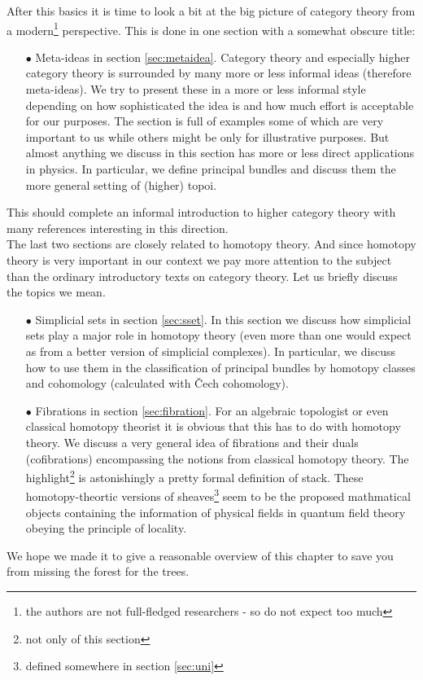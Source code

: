 After this basics it is time to look a bit at the big picture of category theory from a modern\footnote{the authors are not full-fledged researchers - so do not expect too much} perspective. This is done in one section with a somewhat obscure title:
\begin{enumerate}
\item[$\bullet$]
Meta-ideas in section \ref{sec:metaidea}. Category theory and especially higher category theory is surrounded by many more or less informal ideas (therefore meta-ideas). We try to present these in a more or less informal style depending on how sophisticated the idea is and how much effort is acceptable for our purposes. The section is full of examples some of which are very important to us while others might be only for illustrative purposes. But almost anything we discuss in this section has more or less direct applications in physics. In particular, we define principal bundles and discuss them the more general setting of (higher) topoi.
\end{enumerate}
This should complete an informal introduction to higher category theory with many references interesting in this direction.
\\
The last two sections are closely related to homotopy theory. And since homotopy theory is very important in our context we pay more attention to the subject than the ordinary introductory texts on category theory. Let us briefly discuss the topics we mean.
\begin{enumerate}
\item[$\bullet$]
Simplicial sets in section \ref{sec:sset}. In this section we discuss how simplicial sets play a major role in homotopy theory (even more than one would expect as from a better version of simplicial complexes). In particular, we discuss how to use them in the classification of principal bundles by homotopy classes and cohomology ({\glqq}calculated{\grqq} with \v{C}ech cohomology).
\item[$\bullet$]
Fibrations in section \ref{sec:fibration}. For an algebraic topologist or even classical homotopy theorist it is obvious that this has to do with homotopy theory. We discuss a very general idea of fibrations and their duals (cofibrations) encompassing the notions from classical homotopy theory. The highlight\footnote{not only of this section} is astonishingly a pretty formal definition of {\glqq}stack{\grqq}. These homotopy-theortic versions of sheaves\footnote{defined somewhere in section \ref{sec:uni}} seem to be the proposed mathmatical objects containing the information of physical fields in quantum field theory obeying the principle of locality.
\end{enumerate}
We hope we made it to give a reasonable overview of this chapter to save you from missing the forest for the trees.
